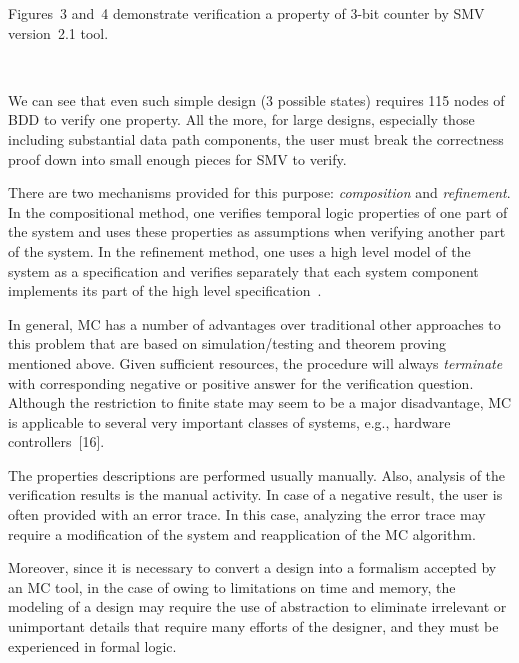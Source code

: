 \begin{multicols}{2}
{}


   Figures~3 and~4 demonstrate verification a property of 3-bit counter by SMV
version~2.1 tool.

\begin{figure*} %
\vspace*{1pt}
\begin{center}
\mbox{%
\epsfxsize=109.25mm %
}
\end{center}
\vspace*{-9pt}
\end{figure*}


   We can see that even such simple design (3 possible states) requires 115 nodes of BDD to verify one
property. All the more, for large designs, especially those including substantial data path components, the user
must break the correctness proof down into small enough pieces for SMV to verify. 

There are two mechanisms
provided for this purpose: \textit{composition} and \textit{refinement}. In the compositional method, one
verifies temporal logic properties of one part of the system and uses these properties as assumptions when
verifying another part of the system. In the refinement method, one uses a high level model of the system as a
specification and verifies separately that each system component implements its part of the high level
specification~\cite{10bar}.

In general, MC has a number of advantages over traditional other approaches to this problem that
are based on simulation/testing and theorem proving mentioned above. Given sufficient resources, the
procedure will always \textit{terminate} with corresponding negative or positive answer for the verification
question. Although the restriction to finite state may seem to be a major disadvantage, MC is
applicable to several very important classes of systems, e.g., hardware controllers~[16].
{

}

The properties descriptions are performed usually manually. Also,
analysis of the verification results is the
manual activity. In case of a negative result, the user is often provided with an error trace. In this case, analyzing
the error trace may require a modification of the system and reapplication of the
MC algorithm.


   Moreover, since it is necessary to convert a design into a formalism accepted by an MC
tool, in the case of owing to limitations on time and memory, the modeling of a design may require the use of
abstraction to eliminate irrelevant or unimportant details
that require many efforts of the designer, and they
must be experienced in formal logic.


\end{multicols}
